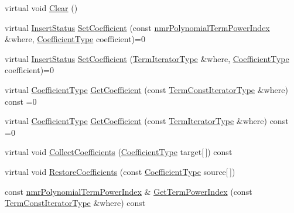 \begin{DoxyCompactItemize}
virtual void \hyperlink{classnmr_polynomial_container_a0d62bc3c08f01936868cbed1b32abeda}{Clear} ()
\item 
virtual \hyperlink{classnmr_polynomial_base_ac3b6b28653104ea70419279a35580940}{Insert\+Status} \hyperlink{classnmr_polynomial_container_a4ac9b1833ec593f10d54baaa7a2ebe81}{Set\+Coefficient} (const \hyperlink{classnmr_polynomial_term_power_index}{nmr\+Polynomial\+Term\+Power\+Index} \&where, \hyperlink{classnmr_polynomial_base_a8693efdfc8585ccb49abea69f74f3eef}{Coefficient\+Type} coefficient)=0
\item 
virtual \hyperlink{classnmr_polynomial_base_ac3b6b28653104ea70419279a35580940}{Insert\+Status} \hyperlink{classnmr_polynomial_container_a5b1188598da1993c8a1497a403af2b18}{Set\+Coefficient} (\hyperlink{classnmr_polynomial_container_a276e57445d038e8a16462f47b85719a3}{Term\+Iterator\+Type} \&where, \hyperlink{classnmr_polynomial_base_a8693efdfc8585ccb49abea69f74f3eef}{Coefficient\+Type} coefficient)=0
\item 
virtual \hyperlink{classnmr_polynomial_base_a8693efdfc8585ccb49abea69f74f3eef}{Coefficient\+Type} \hyperlink{classnmr_polynomial_container_ae2526acacd3b7d957524818a87619a65}{Get\+Coefficient} (const \hyperlink{classnmr_polynomial_container_aba8d31506ab6a487fdc4fe2815469442}{Term\+Const\+Iterator\+Type} \&where) const =0
\item 
virtual \hyperlink{classnmr_polynomial_base_a8693efdfc8585ccb49abea69f74f3eef}{Coefficient\+Type} \hyperlink{classnmr_polynomial_container_ae92f218f650f44ec1c22528cc19d6790}{Get\+Coefficient} (const \hyperlink{classnmr_polynomial_container_a276e57445d038e8a16462f47b85719a3}{Term\+Iterator\+Type} \&where) const =0
\item 
virtual void \hyperlink{classnmr_polynomial_container_a1a543d698e2f173271bdd0642d8404b0}{Collect\+Coefficients} (\hyperlink{classnmr_polynomial_base_a8693efdfc8585ccb49abea69f74f3eef}{Coefficient\+Type} target\mbox{[}$\,$\mbox{]}) const 
\item 
virtual void \hyperlink{classnmr_polynomial_container_a035c9c6e4b57de5106d5de512ce42cca}{Restore\+Coefficients} (const \hyperlink{classnmr_polynomial_base_a8693efdfc8585ccb49abea69f74f3eef}{Coefficient\+Type} source\mbox{[}$\,$\mbox{]})
\item 
const \hyperlink{classnmr_polynomial_term_power_index}{nmr\+Polynomial\+Term\+Power\+Index} \& \hyperlink{classnmr_polynomial_container_aa11e3c563a7f25d0754d2b558731b68f}{Get\+Term\+Power\+Index} (const \hyperlink{classnmr_polynomial_container_aba8d31506ab6a487fdc4fe2815469442}{Term\+Const\+Iterator\+Type} \&where) const 

\end{DoxyCompactItemize}
